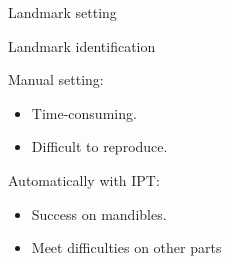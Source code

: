 \documentclass[10pt,svgnames]{beamer}
\begin{document}
\begin{frame}{Landmark setting}{}
	\begin{block}{Landmark identification}		
		\begin{minipage}[t]{0.45\textwidth}
			Manual setting:
			\begin{itemize}
	  			\item Time-consuming.
				\item Difficult to reproduce.
  			\end{itemize}
		\end{minipage}	
		\begin{minipage}[t]{0.5\textwidth}
			Automatically with IPT\footnotemark[1]:
			\begin{itemize}
	  			\item Success on mandibles.
				\item Meet difficulties on other parts
  			\end{itemize}
		\end{minipage}		
	\end{block}{}


\end{frame}
\end{document}
